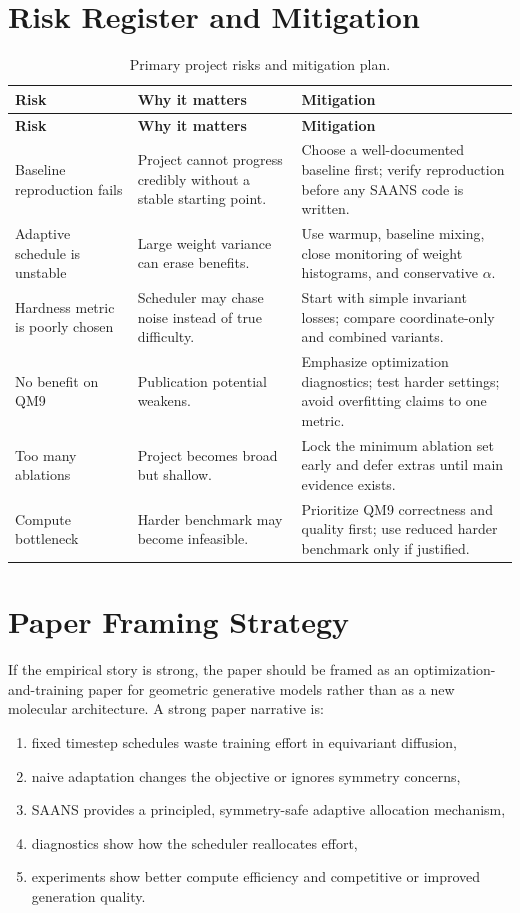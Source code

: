 \documentclass[11pt]{report}
\begin{document}
\chapter{Risk Register and Mitigation}

\begin{longtable}{p{}p{}p{}}
\caption{Primary project risks and mitigation plan.}\label{tab:risk-register} \\
\toprule
\textbf{Risk} & \textbf{Why it matters} & \textbf{Mitigation} \\
\midrule
\endfirsthead
\toprule
\textbf{Risk} & \textbf{Why it matters} & \textbf{Mitigation} \\
\midrule
\endhead
Baseline reproduction fails & Project cannot progress credibly without a stable starting point. & Choose a well-documented baseline first; verify reproduction before any SAANS code is written. \\
Adaptive schedule is unstable & Large weight variance can erase benefits. & Use warmup, baseline mixing, close monitoring of weight histograms, and conservative $\alpha$. \\
Hardness metric is poorly chosen & Scheduler may chase noise instead of true difficulty. & Start with simple invariant losses; compare coordinate-only and combined variants. \\
No benefit on QM9 & Publication potential weakens. & Emphasize optimization diagnostics; test harder settings; avoid overfitting claims to one metric. \\
Too many ablations & Project becomes broad but shallow. & Lock the minimum ablation set early and defer extras until main evidence exists. \\
Compute bottleneck & Harder benchmark may become infeasible. & Prioritize QM9 correctness and quality first; use reduced harder benchmark only if justified. \\
\bottomrule
\end{longtable}

\chapter{Paper Framing Strategy}

If the empirical story is strong, the paper should be framed as an optimization-and-training paper for geometric generative models rather than as a new molecular architecture. A strong paper narrative is:

\begin{enumerate}[leftmargin=2em]
    \item fixed timestep schedules waste training effort in equivariant diffusion,
    \item naive adaptation changes the objective or ignores symmetry concerns,
    \item SAANS provides a principled, symmetry-safe adaptive allocation mechanism,
    \item diagnostics show how the scheduler reallocates effort,
    \item experiments show better compute efficiency and competitive or improved generation quality.
\end{enumerate}
\end{document}
